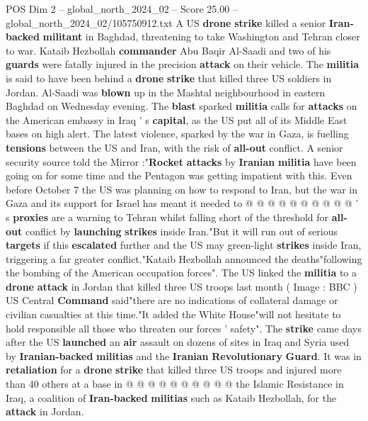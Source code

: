 \begin{textsample}{POS Dim 2 – global\_north\_2024\_02 – Score 25.00 – global\_north\_2024\_02/105750912.txt}  \label{ex:f2_pos_268}
A US \textbf{drone} \textbf{strike} killed a senior \textbf{Iran-backed} \textbf{militant} in Baghdad, threatening to take Washington and Tehran closer to war.
Kataib Hezbollah \textbf{commander} Abu Baqir Al-Saadi and two of his \textbf{guards} were fatally injured in the precision \textbf{attack} on their vehicle.
The \textbf{militia} is said to have been behind a \textbf{drone} \textbf{strike} that killed three US soldiers in Jordan.
Al-Saadi was \textbf{blown} up in the Mashtal neighbourhood in eastern Baghdad on Wednesday evening.
The \textbf{blast} sparked \textbf{militia} calls for \textbf{attacks} on the American embassy in Iraq ' s \textbf{capital}, as the US put all of its Middle East bases on high alert.
The latest violence, sparked by the war in Gaza, is fuelling \textbf{tensions} between the US and Iran, with the risk of \textbf{all-out} conflict.
A senior security source told the Mirror :"\textbf{Rocket} \textbf{attacks} by \textbf{Iranian} \textbf{militia} have been going on for some time and the Pentagon was getting impatient with this.
Even before October 7 the US was planning on how to respond to Iran, but the war in Gaza and its support for Israel has meant it needed to @ @ @ @ @ @ @ @ @ @ ' s \textbf{proxies} are a warning to Tehran whilst falling short of the threshold for \textbf{all-out} conflict by \textbf{launching} \textbf{strikes} inside Iran."But it will run out of serious \textbf{targets} if this \textbf{escalated} further and the US may green-light \textbf{strikes} inside Iran, triggering a far greater conflict."Kataib Hezbollah announced the deaths"following the bombing of the American occupation forces".
The US linked the \textbf{militia} to a \textbf{drone} \textbf{attack} in Jordan that killed three US troops last month ( Image : BBC ) US Central \textbf{Command} said"there are no indications of collateral damage or civilian casualties at this time."It added the White House"will not hesitate to hold responsible all those who threaten our forces ' safety".
The \textbf{strike} came days after the US \textbf{launched} an \textbf{air} assault on dozens of sites in Iraq and Syria used by \textbf{Iranian-backed} \textbf{militias} and the \textbf{Iranian} \textbf{Revolutionary} \textbf{Guard}.
It was in \textbf{retaliation} for a \textbf{drone} \textbf{strike} that killed three US troops and injured more than 40 others at a base in @ @ @ @ @ @ @ @ @ @ the Islamic Resistance in Iraq, a coalition of \textbf{Iran-backed} \textbf{militias} such as Kataib Hezbollah, for the \textbf{attack} in Jordan.

\end{textsample}
